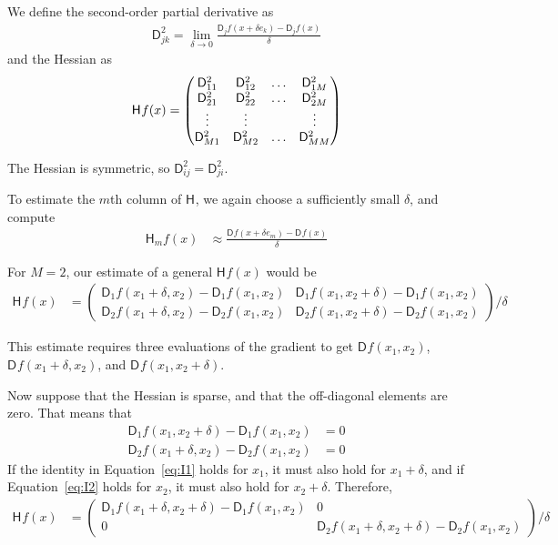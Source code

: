 \documentclass[article]{jss}\usepackage[]{graphicx}\usepackage[]{color}
\newcommand{\parD}[3]{\mathsf{D}^{#1}_{#2}#3}
\newcommand{\hess}[2]{\mathsf{H}_{#1}#2}
\begin{document}
We define the second-order partial derivative as
\begin{align}
  \label{eq:14}
  \parD{2}{jk}{}=\lim\limits_{\delta\to 0}\frac{\parD{}{j}{f(x+\delta e_k)}-\parD{}{j}{f(x)}}{\delta}
\end{align}
and the Hessian as
\begin{align}
  \label{eq:15}
  \hess{}{f(x)}=
  \begin{pmatrix}
    \parD{2}{11}{}&  \parD{2}{12}{}&  \mathellipsis &  \parD{2}{1M}{}\\
    \parD{2}{21}{}&  \parD{2}{22}{}&  \mathellipsis &  \parD{2}{2M}{}\\
    \vdots&\vdots&&\vdots\\
    \parD{2}{M1}{}&  \parD{2}{M2}{}&  \mathellipsis &  \parD{2}{MM}{}
    \end{pmatrix}
\end{align}

The Hessian is symmetric, so $\parD{2}{ij}{}=\parD{2}{ji}{}$.

To estimate the $m$th column of $\hess{}{}$, we again choose a
sufficiently small $\delta$, and compute
\begin{align}
  \label{eq:1}
  \hess{m}{f(x)}&\approx\frac{\parD{}{}{f(x+\delta e_m)}-\parD{}{}{f(x)}}{\delta}
\end{align}

For $M=2$, our estimate of a general $\hess{}{f(x)}$ would be
\begin{align}
  \label{eq:FDhess2}
  \hess{}{f(x)}&=
  \begin{pmatrix}
    \parD{}{1}{f(x_1+\delta, x_2)}-\parD{}{1}{f(x_1,x_2)}& \parD{}{1}{f(x_1,x_2+\delta)}-\parD{}{1}{f(x_1,x_2)}\\
        \parD{}{2}{f(x_1+\delta, x_2)}-\parD{}{2}{f(x_1,x_2)}&  \parD{}{2}{f(x_1,x_2+\delta)}-\parD{}{2}{f(x_1,x_2)}
    \end{pmatrix}/\delta
\end{align}

This estimate requires three evaluations of the gradient to get
${\parD{}{}{f(x_1,x_2)}}$, ${\parD{}{}{f(x_1+\delta,x_2)}}$, and
${\parD{}{}{f(x_1,x_2+\delta)}}$.

Now suppose that the Hessian is sparse, and that the off-diagonal
elements are zero.  That means that
\begin{align}
  \parD{}{1}{f(x_1,x_2+\delta)}-\parD{}{1}{f(x_1,x_2)}&=0\label{eq:I1}\\
    \parD{}{2}{f(x_1+\delta,x_2)}-\parD{}{2}{f(x_1,x_2)}&=0\label{eq:I2}
\end{align}
If the identity in Equation~\ref{eq:I1} holds for $x_1$, it must also
hold for $x_1+\delta$, and if Equation~\ref{eq:I2} holds for $x_2$, it
must also hold for $x_2+\delta$.  Therefore,
\begin{align}
  \label{eq:FDhess2sp}
  \hess{}{f(x)}&=
  \begin{pmatrix}
    \parD{}{1}{f(x_1+\delta, x_2+\delta)}-\parD{}{1}{f(x_1,x_2)}&0\\
        0&  \parD{}{2}{f(x_1+\delta,x_2+\delta)}-\parD{}{2}{f(x_1,x_2)}
    \end{pmatrix}/\delta
\end{align}
\end{document}
